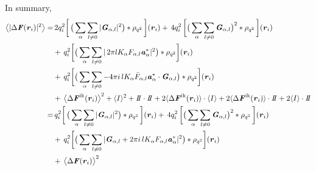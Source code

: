 \documentclass[aps,pre,preprint]{revtex4}
\renewcommand{\v}[1]{\textbf{\textit{#1}}}
\begin{document}
In summary,
\begin{align}\nonumber
  \big\langle
  \vert \Delta\v F(\v r_i)\vert^2
  \big\rangle
  =&\, 
  2q_i^2
  \bigg[\,
  \big(
  \sum_{\alpha} \sum_{l\neq 0}
  \vert \v G_{\alpha,l}\vert^2
  \big)
  \ast \rho_{q^2}
  \,\bigg] (\v r_i)
  +\,
  4q_i^2\,
  \bigg[
  \big(
  \sum_{\alpha} \sum_{l\neq 0}  
  \v G_{\alpha,l}
  \big)^2
  \ast \rho_{q^2}\,
  \bigg] (\v r_i) \\\nonumber
  & +\,
  q_i^2
  \bigg[
  \big(
  \sum_{\alpha}\sum_{l\neq 0}
  \vert\,
  2\pi l K_\alpha F_{\alpha,l} \v a_\alpha^\ast\vert^2
  \big)
  \ast \rho_{q^2}
  \bigg]
  (\v r_i) \\\nonumber
  & +\,
  q^2_i
  \bigg[
  \big(
  \sum_{\alpha}\sum_{l\neq 0}
  -4\pi i\,l K_\alpha \bar F_{\alpha,l}\v a_\alpha ^\ast\cdot\v G_{\alpha,l} 
  \big)\ast \rho_{q^2}
  \bigg] (\v r_i) \\\nonumber
  &+\,
  \big\langle
  \Delta\v F^{\textrm{ik}}(\v r_i)
  \big\rangle  ^2 +
  \langle I\rangle^2  + I\negthickspace I\cdot I\negthickspace I
  + 2\langle\Delta\v F^{\textrm{ik}}(\v r_i)\rangle \cdot\langle I\rangle
  + 2\langle\Delta\v F^{\textrm{ik}}(\v r_i)\rangle\cdot I\negthickspace I
  + 2\langle I\rangle\cdot I\negthickspace I \\\nonumber
  =&\,
  q_i^2
  \bigg[\,
  \big(
  \sum_{\alpha} \sum_{l\neq 0}
  \vert \v G_{\alpha,l}\vert^2
  \big)
  \ast \rho_{q^2}
  \,\bigg] (\v r_i)
  +\,
  4q_i^2\,
  \bigg[
  \big(
  \sum_{\alpha} \sum_{l\neq 0}  
  \v G_{\alpha,l}
  \big)^2
  \ast \rho_{q^2}\,
  \bigg] (\v r_i) \\\nonumber
  & +\,
  q_i^2
  \bigg[
  \big(
  \sum_{\alpha}\sum_{l\neq 0}
  \vert
  \v G_{\alpha,l} + 2\pi i\,l K_\alpha F_{\alpha,l} \v a_\alpha^\ast\vert^2
  \big)
  \ast \rho_{q^2}
  \bigg]
  (\v r_i) \\
  & +\,
  \big\langle \Delta\v F(\v r_i)\big\rangle ^2
\end{align}
\end{document}
